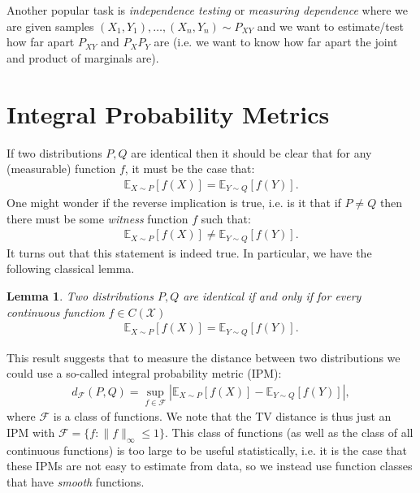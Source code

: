 \documentclass[twoside,12pt]{article}
\newtheorem{lemma}[theorem]{Lemma}
\begin{document}
Another popular task is \emph{independence testing} or \emph{measuring dependence} where we are given samples $(X_1,Y_1), \ldots, (X_n,Y_n) \sim P_{XY}$ and we want to estimate/test how far apart $P_{XY}$ and $P_X P_Y$ are (i.e. we want to know how far apart the joint and product of marginals are).

\section{Integral Probability Metrics}
If two distributions $P,Q$ are identical then it should be clear that for any (measurable) function $f$, it must be the case that:
\begin{align*}
\mathbb{E}_{X \sim P} [f(X)] = \mathbb{E}_{Y \sim Q} [f(Y)].
\end{align*}
One might wonder if the reverse implication is true, i.e. is it that if $P \neq Q$ then there must be some \emph{witness} function $f$ such that:
\begin{align*}
\mathbb{E}_{X \sim P} [f(X)] \neq \mathbb{E}_{Y \sim Q} [f(Y)].
\end{align*}
It turns out that this statement is indeed true. In particular, we have the following classical lemma.
\begin{lemma}
Two distributions $P,Q$ are identical if and only if for every continuous function $f \in C(\mathcal{X})$
\begin{align*}
\mathbb{E}_{X \sim P} [f(X)] = \mathbb{E}_{Y \sim Q} [f(Y)].
\end{align*}
\end{lemma}

This result suggests that to measure the distance between two distributions we could use a so-called integral probability metric (IPM):
\begin{align*}
d_{\mathcal{F}}(P,Q) = \sup_{f \in \mathcal{F}} |\mathbb{E}_{X \sim P} [f(X)] - \mathbb{E}_{Y \sim Q} [f(Y)]|,
\end{align*}
where $\mathcal{F}$ is a class of functions. We note that the TV distance is thus just an IPM with 
$\mathcal{F} = \{f: \|f\|_{\infty} \leq 1\}.$
This class of functions (as well as the class of all continuous functions)
is too large to be useful statistically, i.e. it is the case that these IPMs are not easy to estimate from data, so we instead use function classes that have \emph{smooth} functions.
\end{document}
